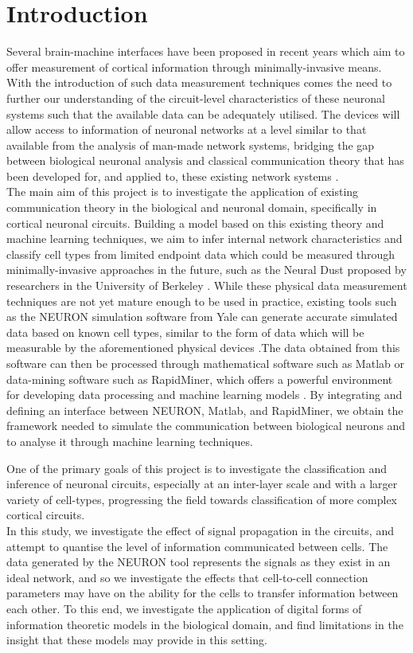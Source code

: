 \chapter{Introduction}

Several brain-machine interfaces have been proposed in recent years which aim to offer measurement of cortical information through minimally-invasive means. With the introduction of such data measurement techniques comes the need to further our understanding of the circuit-level characteristics of these neuronal systems such that the available data can be adequately utilised. The devices will allow access to information of neuronal networks at a level similar to that available from the analysis of man-made network systems, bridging the gap between biological neuronal analysis and classical communication theory that has been developed for, and applied to, these existing network systems \cite{mBarrosMolCom}.\\
The main aim of this project is to investigate the application of existing communication theory in the biological and neuronal domain, specifically in cortical neuronal circuits. Building a model based on this existing theory and machine learning techniques, we aim to infer internal network characteristics and classify cell types from limited endpoint data which could be measured through minimally-invasive approaches in the future, such as the Neural Dust proposed by researchers in the University of Berkeley \cite{NeurDust}. While these physical data measurement techniques are not yet mature enough to be used in practice, existing tools such as the NEURON simulation software from Yale can generate accurate simulated data based on known cell types, similar to the form of data which will be measurable by the aforementioned physical devices \cite{NEURON}.The data obtained from this software can then be processed through mathematical software such as Matlab or data-mining software such as RapidMiner, which offers a powerful environment for developing data processing and machine learning models \cite{rapidMiner}. By integrating and defining an interface between NEURON, Matlab, and RapidMiner, we obtain the framework needed to simulate the communication between biological neurons and to analyse it through machine learning techniques.
\par
One of the primary goals of this project is to investigate the classification and inference of neuronal circuits, especially at an inter-layer scale and with a larger variety of cell-types, progressing the field towards classification of more complex cortical circuits.\\
In this study, we investigate the effect of signal propagation in the circuits, and attempt to quantise the level of information communicated between cells. The data generated by the NEURON tool represents the signals as they exist in an ideal network, and so we investigate the effects that cell-to-cell connection parameters may have on the ability for the cells to transfer information between each other. To this end, we investigate the application of digital forms of information theoretic models in the biological domain, and find limitations in the insight that these models may provide in this setting.\\

